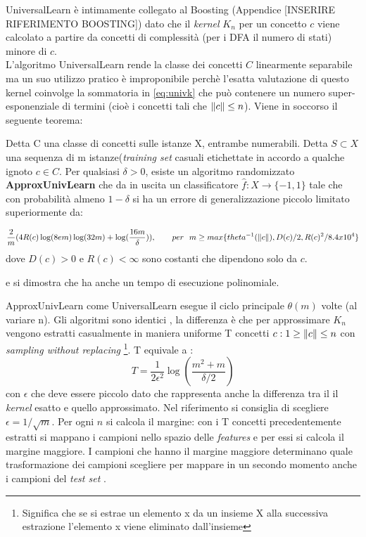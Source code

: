 UniversalLearn è intimamente collegato al Boosting (Appendice [INSERIRE RIFERIMENTO BOOSTING]) dato che il \textit{kernel} $K_n$ per un concetto $c$ viene calcolato a partire da concetti di complessità (per i \ac{DFA} il numero di stati) minore di $c$. \\

L'algoritmo UniversalLearn rende la classe dei concetti $C$ linearmente separabile ma un suo utilizzo pratico è improponibile  perchè l'esatta valutazione di questo kernel coinvolge la sommatoria in \eqref{eq:univk} che può contenere un numero super-esponenziale di termini (cioè i concetti tali che $\lVert c\rVert \leq n$). Viene in soccorso il seguente teorema:

\begin{teorema}
Detta C una classe di concetti sulle istanze X, entrambe numerabili. Detta $S \subset X$ una sequenza di m istanze(\textit{training set} casuali etichettate in accordo a qualche ignoto $c \in C$. Per qualsiasi $\delta > 0$, esiste un algoritmo randomizzato \textbf{ApproxUnivLearn} che da in uscita un classificatore $\hat{f} : X \to \{-1,1\}$ tale che con probabilità almeno $1 - \delta$ si ha un errore di generalizzazione piccolo limitato superiormente da:
 
 \begin{equation*}
\frac{2}{m}(4R(c) \log(8em)\log(32m)+\log(\frac{16m}{\delta}) ), \quad\quad per \:\:\: m \geq  max\{theta^{-1}(\lVert c\rVert) , D(c)/2 , R(c)^{2}/8.4 x 10^{4}\}
\end{equation*}
dove $D(c)>0$ e $R(c) < \infty$ sono costanti che dipendono solo da $c$.
\end{teorema}

e si dimostra che ha anche un tempo di esecuzione polinomiale.

ApproxUnivLearn come UniversalLearn esegue il ciclo principale $\theta(m)$ volte (al variare n). Gli algoritmi sono identici , la differenza è che per approssimare $K_n$ vengono estratti casualmente in maniera uniforme T  concetti $c :  1 \geq \lVert c\rVert \leq n$ con \textit{sampling without replacing} \footnote{Significa che se si estrae un elemento x da un insieme X alla successiva estrazione l'elemento x viene eliminato dall'insieme}. T equivale a :
\begin{equation*}
T = \frac{1}{2\epsilon^{2}}\log(\frac{m^{2}+m}{\delta/2})
\end{equation*}
con $\epsilon$ che deve essere piccolo dato che rappresenta anche la differenza tra il il \textit{kernel} esatto e quello approssimato. Nel riferimento si consiglia di scegliere $\epsilon = 1/\sqrt{m}$.  Per ogni $n$ si calcola il margine: con i T concetti precedentemente estratti si mappano i campioni nello spazio delle \textit{features} e per essi si calcola il margine maggiore. I campioni che hanno il margine maggiore determinano  quale trasformazione dei campioni scegliere per mappare in un secondo momento anche i campioni del \textit{test set} .

